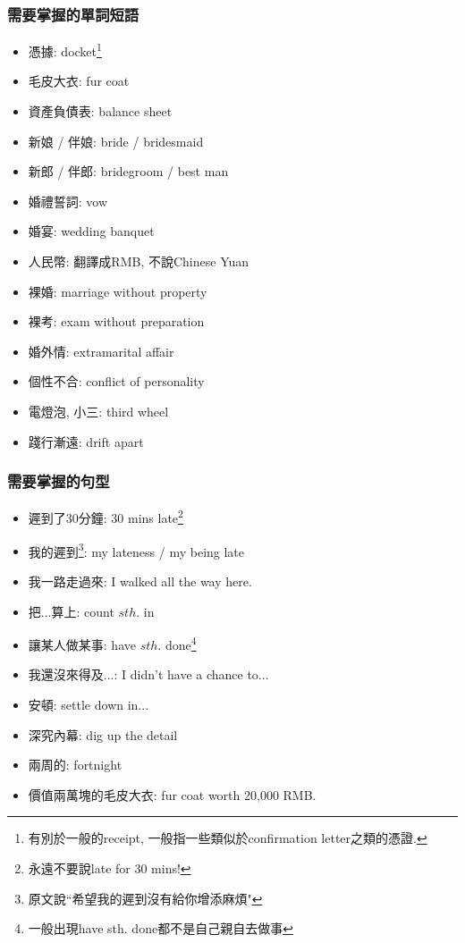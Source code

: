 \subsubsection*{需要掌握的單詞短語}
\begin{multicols}{2}
\begin{itemize}
  \itemsep0em
  \item 憑據: docket\footnote{有別於一般的receipt, 一般指一些類似於confirmation letter之類的憑證.}
  \item 毛皮大衣: fur coat
  \item 資產負債表: balance sheet
  \item 新娘 / 伴娘: bride / bridesmaid
  \item 新郎 / 伴郎: bridegroom / best man
  \item 婚禮誓詞: vow
  \item 婚宴: wedding banquet
  \item 人民幣: 翻譯成RMB, 不說Chinese Yuan
  \item 裸婚: marriage without property
  \item 裸考: exam without preparation
  \item 婚外情: extramarital affair
  \item 個性不合: conflict of personality
  \item 電燈泡, 小三: third wheel
  \item 踐行漸遠: drift apart
\end{itemize}
\end{multicols}

\subsubsection*{需要掌握的句型}
\begin{multicols}{2}
\begin{itemize}
  \itemsep0em
  \item 遲到了30分鐘: 30 mins late\footnote{永遠不要說late for 30 mins!}
  \item 我的遲到\footnote{原文說``希望我的遲到沒有給你增添麻煩"}: my lateness / my being late
  \item 我一路走過來: I walked all the way here.
  \item 把...算上: count $sth.$ in
  \item 讓某人做某事: have $sth.$ done\footnote{一般出現have sth. done都不是自己親自去做事}
  \item 我還沒來得及...: I didn't have a chance to...
  \item 安頓: settle down in...
  \item 深究內幕: dig up the detail
  \item 兩周的: fortnight
  \item 價值兩萬塊的毛皮大衣: fur coat worth 20,000 RMB.
\end{itemize}
\end{multicols}


